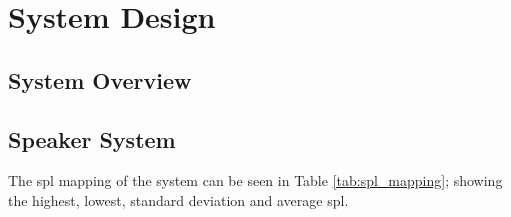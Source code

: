\section{System Design}
    
    \subsection{System Overview}
        
    \subsection{Speaker System}
    The \acrshort{spl} mapping of the system can be seen in Table \ref{tab:spl_mapping}; showing the highest, lowest, standard deviation and average \acrshort{spl}.

